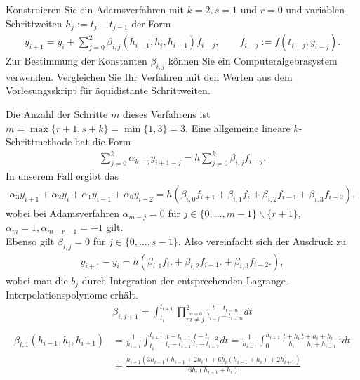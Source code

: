 \begin{exercise}
Konstruieren Sie ein Adamsverfahren mit $k = 2, s = 1$ und $r = 0$ und variablen
Schrittweiten $h_j := t_j - t_{j-1}$ der Form
\begin{align}
  y_{i+1} = y_i + \sum_{j=0}^2 \beta_{i,j}(h_{i-1},h_i,h_{i+1})f_{i-j},
  \qquad f_{i-j} := f(t_{i-j},y_{i-j}).
\end{align}
Zur Bestimmung der Konstanten $\beta_{i,j}$ können Sie ein Computeralgebrasystem
verwenden. Vergleichen Sie Ihr Verfahren mit den Werten aus dem Vorlesungsskript
für äquidistante Schrittweiten.
\end{exercise}
\begin{solution}
Die Anzahl der Schritte $m$ dieses Verfahrens ist $m = \max\{r+1,s+k\}=\min\{1,3\} = 3$.
Eine allgemeine lineare $k$-Schrittmethode hat die Form
\begin{align*}
  \sum_{j = 0}^k \alpha_{k - j}y_{i+1-j} = h \sum_{j = 0}^k \beta_{i,j}f_{i-j}.
\end{align*}
In unserem Fall ergibt das
\begin{align*}
  \alpha_3 y_{i + 1} + \alpha_2 y_{i} + \alpha_1 y_{i - 1} + \alpha_0 y_{i - 2} =
  h \left(\beta_{i,0} f_{i+1} +
  \beta_{i,1} f_{i} +
  \beta_{i,2} f_{i-1} +
  \beta_{i,3} f_{i-2}\right),
\end{align*}
wobei bei Adamsverfahren $\alpha_{m-j} = 0$ für $j \in \{0,\dots,m-1\}\backslash\{r+1\}$,
$\alpha_m = 1, \alpha_{m-r-1} = -1$ gilt. \\
Ebenso gilt $\beta_{i,j} = 0$ für $j \in \{0,\dots,s-1\}$.
Also vereinfacht sich der Ausdruck zu
\begin{align*}
y_{i + 1} - y_{i} =
h \left(
\beta_{i,1} f_{i}. +
\beta_{i,2} f_{i-1}. +
\beta_{i,3} f_{i-2}.\right),
\end{align*}
wobei man die $b_j$ durch Integration der entsprechenden Lagrange-Interpolationspolynome erhält.
\begin{align*}
  \beta_{i,j+1} = \int_{t_{i}}^{t_{i + 1}} \prod_{\stackrel{m = 0}{m \neq j}}^{2}
  \frac{t - t_{i - m}}{t_{i - j} - t_{i - m}}dt \\
\end{align*}
\begin{align*}
  \beta_{i,1}(h_{i-1},h_i,h_{i+1}) &= \frac{1}{h_{i+1}}\int_{t_i}^{t_{i + 1}}
  \frac{t - t_{i - 1}}{t_{i} - t_{i - 1}}\frac{t - t_{i - 2}}{t_{i} - t_{i - 2}}dt
  = \frac{1}{h_{i+1}}\int_{0}^{h_{i+1}}
  \frac{t + h_i}{h_i}\frac{t + h_i + h_{i-1}}{h_i + h_{i-1}}dt \\
  &= \frac{h_{i+1}(3h_{i+1}(h_{i-1} + 2h_i) + 6h_i(h_{i-1} + h_i) + 2h_{i+1}^2)}{6h_i(h_{i-1} + h_i)}\\

\end{align*}
\end{solution}

